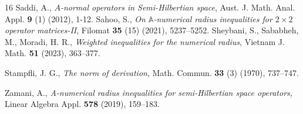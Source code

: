 \documentclass[preprint,12pt,3p]{elsarticle}
\begin{document}
\begin{thebibliography}{16}
 Saddi, A., \textit{$A$-normal operators in Semi-Hilbertian space}, Aust. J. Math. Anal. Appl. {\bf 9} (1) (2012), 1-12.
  Sahoo, S., \textit{On $\mathbb{A}$-numerical radius inequalities for $2\times2$ operator matrices-II}, Filomat {\textbf {35}} (15) (2021), 5237--5252.
 Sheybani, S., Sababheh, M., Moradi, H. R., \textit{Weighted inequalities for the numerical radius}, Vietnam J. Math. {\bf51} (2023), 363--377.


 Stampfli, J. G., \textit{The norm of derivation}, Math. Commun. {\bf 33} (3) (1970), 737--747.


	
  
 Zamani, A.,  \textit{A-numerical radius inequalities for semi-Hilbertian space operators,} Linear Algebra Appl. \textbf{578} (2019), 159--183.

 










\end{thebibliography}
\end{document}
